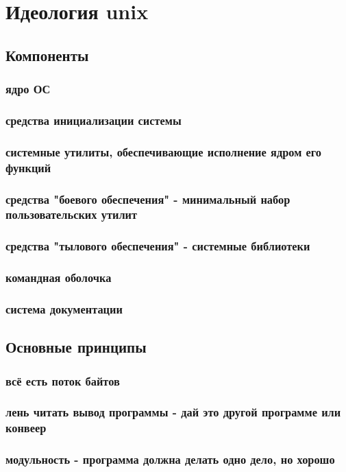 \chapter {Идеология unix}
\section {Компоненты}
\subsection{ядро ОС}
\subsection{средства инициализации системы}
\subsection{системные утилиты, обеспечивающие исполнение ядром его функций}
\subsection{средства "боевого обеспечения" - минимальный набор пользовательских утилит}
\subsection{средства "тылового обеспечения" - системные библиотеки}
\subsection{командная оболочка}
\subsection{система документации}
\section {Основные принципы}
\subsection{всё есть поток байтов}
\subsection{лень читать вывод программы - дай это другой программе или конвеер}
\subsection{модульность - программа должна делать одно дело, но хорошо}
